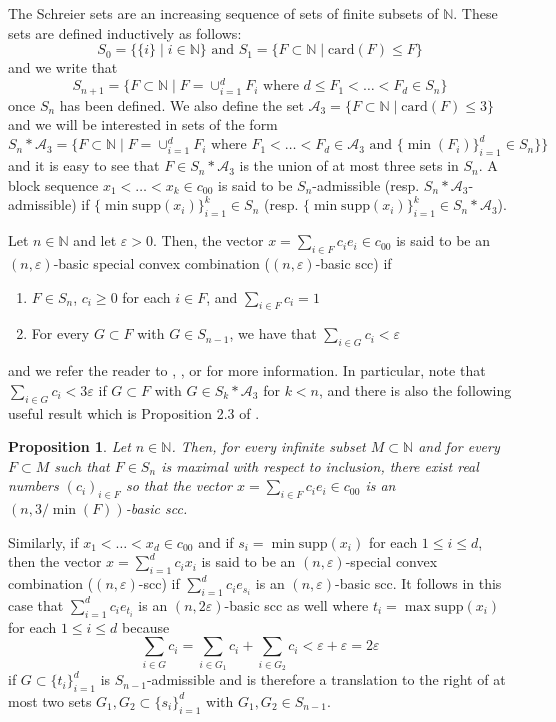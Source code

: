 \documentclass[12pt,a4paper]{amsart}
\newcommand{\N}{\mathbb{N}}
\newcommand{\bes}{\begin{equation*}}
\newcommand{\ees}{\end{equation*}}
\newcommand{\ep}{\varepsilon}
\newcommand{\supp}{\text{supp}}
\theoremstyle{definition}
\theoremstyle{plain}
\newtheorem{proposition}[question]{Proposition}
\begin{document}
The Schreier sets are an increasing sequence of sets of finite subsets of $\N$. These sets are defined inductively as follows:
\bes S_{0}=\{\{i\} \mid i\in\N\} \text{ and } S_{1}=\{F\subset\N \mid \text{card}(F)\leq F\} \ees
and we write that
\bes S_{n+1}=\{ F\subset\N \mid F=\cup_{i=1}^{d}F_{i} \text{ where } d\leq F_{1}<\ldots<F_{d}\in S_{n}\} \ees
once $S_{n}$ has been defined. We also define the set $\mathcal{A}_{3}=\{ F\subset\N \mid \text{card}(F)\leq 3\}$ and we will be interested in sets of the form
\bes S_{n}\ast\mathcal{A}_{3} = \{ F\subset\N \mid F=\cup_{i=1}^{d} F_{i} \text{ where } F_{1}<\ldots<F_{d}\in\mathcal{A}_{3} \text{ and } \{\min(F_{i})\}_{i=1}^{d}\in S_{n}\} \} \ees
and it is easy to see that $F\in S_{n}\ast\mathcal{A}_{3}$ is the union of at most three sets in $S_{n}$. A block sequence $x_{1}<\ldots<x_{k}\in c_{00}$ is said to be $S_{n}$-admissible (resp. $S_{n}\ast\mathcal{A}_{3}$-admissible) if $\{\min\supp(x_{i})\}_{i=1}^{k}\in S_{n}$ (resp. $\{\min\supp(x_{i})\}_{i=1}^{k}\in S_{n}\ast\mathcal{A}_{3}$).

Let $n\in\N$ and let $\ep>0$. Then, the vector $x=\sum_{i\in F}c_{i}e_{i}\in c_{00}$ is said to be an $(n,\ep)$-basic special convex combination ($(n,\ep)$-basic scc) if
\begin{enumerate}
\item $F\in S_{n}$, $c_{i}\geq 0$ for each $i\in F$, and $\sum_{i\in F}c_{i}=1$
\item For every $G\subset F$ with $G\in S_{n-1}$, we have that $\sum_{i\in G}c_{i}<\ep$
\end{enumerate}
and we refer the reader to \cite{argyros:deliyanni:1997}, \cite{argyros:godefroy:rosenthal:2003}, or \cite{argyros:tolias:2004} for more information. In particular, note that $\sum_{i\in G}c_{i}<3\ep$ if $G\subset F$ with $G\in S_{k}\ast\mathcal{A}_{3}$ for $k<n$, and there is also the following useful result which is Proposition 2.3 of \cite{argyros:tolias:2004}.

\begin{proposition}{\label{basic-scc-maximal}}
Let $n\in\N$. Then, for every infinite subset $M\subset\N$ and for every $F\subset M$ such that $F\in S_{n}$ is maximal with respect to inclusion, there exist real numbers $(c_{i})_{i\in F}$ so that the vector $x=\sum_{i\in F}c_{i}e_{i}\in c_{00}$ is an $(n,3/\min(F))$-basic scc.
\end{proposition}

Similarly, if $x_{1}<\ldots<x_{d}\in c_{00}$ and if $s_{i}=\min\supp(x_{i})$ for each $1\leq i\leq d$, then the vector $x=\sum_{i=1}^{d}c_{i}x_{i}$ is said to be an $(n,\ep)$-special convex combination ($(n,\ep)$-scc) if $\sum_{i=1}^{d}c_{i}e_{s_{i}}$ is an $(n,\ep)$-basic scc. It follows in this case that $\sum_{i=1}^{d}c_{i}e_{t_{i}}$ is an $(n,2\ep)$-basic scc as well where $t_{i}=\max\supp(x_{i})$ for each $1\leq i\leq d$ because
\bes \sum_{i\in G}c_{i}=\sum_{i\in G_{1}}c_{i}+\sum_{i\in G_{2}}c_{i}<\ep+\ep=2\ep \ees
if $G\subset\{t_{i}\}_{i=1}^{d}$ is $S_{n-1}$-admissible and is therefore a translation to the right of at most two sets $G_{1},G_{2}\subset\{s_{i}\}_{i=1}^{d}$ with $G_{1},G_{2}\in S_{n-1}$.
\end{document}

